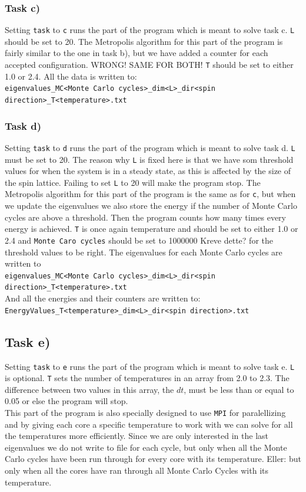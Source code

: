 \documentclass{article}
\newcommand{\husk}[1]{\color{red} #1 \color{black}}
\begin{document}
\subsubsection*{Task c)}
Setting \texttt{task} to \texttt{c} runs the part of the program which is meant to solve task c. \texttt{L} should be set to 20. The Metropolis algorithm for this part of the program is fairly similar to the one in task b), but we have added a counter for each accepted configuration. \husk{WRONG! SAME FOR BOTH!} \texttt{T} should be set to either 1.0 or 2.4. All the data is written to: \\
\texttt{eigenvalues\_MC<Monte Carlo cycles>\_dim<L>\_dir<spin direction>\_T<temperature>.txt} 
\subsubsection*{Task d)}
Setting \texttt{task} to \texttt{d} runs the part of the program which is meant to solve task d. \texttt{L} must be set to 20. The reason why \texttt{L} is fixed here is that we have som threshold values for when the system is in a steady state, as this is affected by the size of the spin lattice. Failing to set \texttt{L} to 20 will make the program stop. The Metropolis algorithm for this part of the program is the same as for \texttt{c}, but when we update the eigenvalues we also store the energy if the number of Monte Carlo cycles are above a threshold. Then the program counts how many times every energy is achieved. \texttt{T} is once again temperature and should be set to either 1.0 or 2.4 and \texttt{Monte Caro cycles} should be set to 1000000 \husk{Kreve dette?} for the threshold values to be right. The eigenvalues for each Monte Carlo cycles are written to \\
\texttt{eigenvalues\_MC<Monte Carlo cycles>\_dim<L>\_dir<spin direction>\_T<temperature>.txt}  \\
And all the energies and their counters are written to: \\
\texttt{EnergyValues\_T<temperature>\_dim<L>\_dir<spin direction>.txt}
\subsection*{Task e)}
Setting \texttt{task} to \texttt{e} runs the part of the program which is meant to solve task e. \texttt{L} is optional. \texttt{T} sets the number of temperatures in an array from 2.0 to 2.3. The difference between two values in this array, the $dt$, must be less than or equal to 0.05 or else the program will stop. \\
This part of the program is also specially designed to use \texttt{MPI} for paralellizing and by giving each core a specific temperature to work with we can solve for all the temperatures more efficiently. Since we are only interested in the last eigenvalues we do not write to file for each cycle, but only when all the Monte Carlo cycles have been run through for every core with its temperature.
\husk{Eller:   but only when all the cores have ran through all Monte Carlo Cycles with its temperature.}
\end{document}

